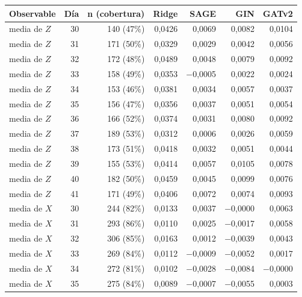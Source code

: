\begin{table}[htbp]
    \centering
    {\footnotesize
    \begin{tabular}{@{}lrrrrrr@{}}
        \toprule
        \textbf{Observable} & \textbf{Día} & \textbf{n (cobertura)} & \textbf{Ridge} & \textbf{SAGE} & \textbf{GIN} & \textbf{GATv2} \\
        \midrule
        media de $Z$ & 30 & 140 (47\%) & 0,0426 & 0,0069 & 0,0082 & 0,0104 \\
        media de $Z$ & 31 & 171 (50\%) & 0,0329 & 0,0029 & 0,0042 & 0,0056 \\
        media de $Z$ & 32 & 172 (48\%) & 0,0489 & 0,0048 & 0,0079 & 0,0092 \\
        media de $Z$ & 33 & 158 (49\%) & 0,0353 & $-$0,0005 & 0,0022 & 0,0024 \\
        media de $Z$ & 34 & 153 (46\%) & 0,0381 & 0,0034 & 0,0057 & 0,0037 \\
        media de $Z$ & 35 & 156 (47\%) & 0,0356 & 0,0037 & 0,0051 & 0,0054 \\
        media de $Z$ & 36 & 166 (52\%) & 0,0374 & 0,0031 & 0,0080 & 0,0092 \\
        media de $Z$ & 37 & 189 (53\%) & 0,0312 & 0,0006 & 0,0026 & 0,0059 \\
        media de $Z$ & 38 & 173 (51\%) & 0,0418 & 0,0032 & 0,0051 & 0,0044 \\
        media de $Z$ & 39 & 155 (53\%) & 0,0414 & 0,0057 & 0,0105 & 0,0078 \\
        media de $Z$ & 40 & 182 (50\%) & 0,0459 & 0,0045 & 0,0099 & 0,0076 \\
        media de $Z$ & 41 & 171 (49\%) & 0,0406 & 0,0072 & 0,0074 & 0,0093 \\
        media de $X$ & 30 & 244 (82\%) & 0,0133 & 0,0037 & $-$0,0000 & 0,0063 \\
        media de $X$ & 31 & 293 (86\%) & 0,0110 & 0,0025 & $-$0,0017 & 0,0058 \\
        media de $X$ & 32 & 306 (85\%) & 0,0163 & 0,0012 & $-$0,0039 & 0,0043 \\
        media de $X$ & 33 & 269 (84\%) & 0,0112 & $-$0,0009 & $-$0,0052 & 0,0017 \\
        media de $X$ & 34 & 272 (81\%) & 0,0102 & $-$0,0028 & $-$0,0084 & $-$0,0000 \\
        media de $X$ & 35 & 275 (84\%) & 0,0089 & $-$0,0007 & $-$0,0055 & 0,0003 \\

\end{tabular}}
\end{table}
